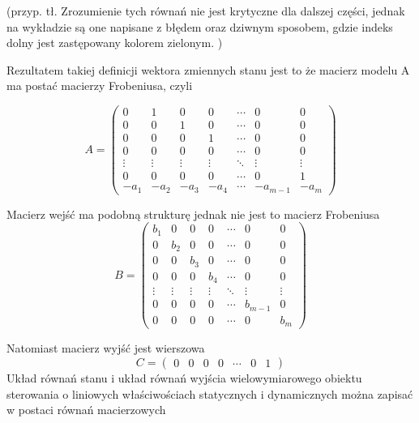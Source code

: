 \documentclass{article}
\begin{document}
		(przyp. tł. Zrozumienie tych równań nie jest krytyczne dla dalszej części,
		jednak na wykładzie są one napisane z błędem oraz dziwnym sposobem, gdzie
		indeks dolny jest zastępowany kolorem zielonym. )

		Rezultatem takiej definicji wektora zmiennych stanu jest to że macierz modelu A
		ma postać macierzy Frobeniusa, czyli

		\begin{equation}
			A=\begin{pmatrix}
			  0    &   1    &   0    &   0    & \cdots &   0      &   0    \\
			  0    &   0    &   1    &   0    & \cdots &   0      &   0    \\
			  0    &   0    &   0    &   1    & \cdots &   0      &   0    \\
			  0    &   0    &   0    &   0    & \cdots &   0      &   0    \\
			\vdots & \vdots & \vdots & \vdots & \ddots & \vdots   & \vdots \\
			  0    &   0    &   0    &   0    & \cdots &   0      &   1    \\
			 -a_{1}&  -a_{2}&  -a_{3}&  -a_{4}& \cdots & -a_{m-1} & -a_{m}
			\end{pmatrix}
		\end{equation}

		Macierz wejść ma podobną strukturę jednak nie jest to macierz Frobeniusa
		\begin{equation}
			B=\begin{pmatrix}
			  b_{1} &   0    &   0    &   0    & \cdots &   0      &   0    \\
			  0     &  b_{2} &   0    &   0    & \cdots &   0      &   0    \\
			  0     &   0    & b_{3}  &   0    & \cdots &   0      &   0    \\
			  0     &   0    &   0    &  b_{4} & \cdots &   0      &   0    \\
			\vdots  & \vdots & \vdots & \vdots & \ddots & \vdots   & \vdots \\
			  0     &   0    &   0    &   0    & \cdots &  b_{m-1} &   0    \\
			  0     &   0    &   0    &   0    & \cdots &   0      &   b_{m}
			\end{pmatrix}
		\end{equation}

		Natomiast macierz wyjść jest wierszowa
		\begin{equation}
			C=\begin{pmatrix}
			  0    &   0    &   0    &   0    & \cdots &   0      &   1
			\end{pmatrix}
		\end{equation}
		Układ równań stanu i układ równań wyjścia wielowymiarowego obiektu sterowania o
		liniowych właściwościach statycznych i dynamicznych można zapisać w postaci
		równań macierzowych
\end{document}

